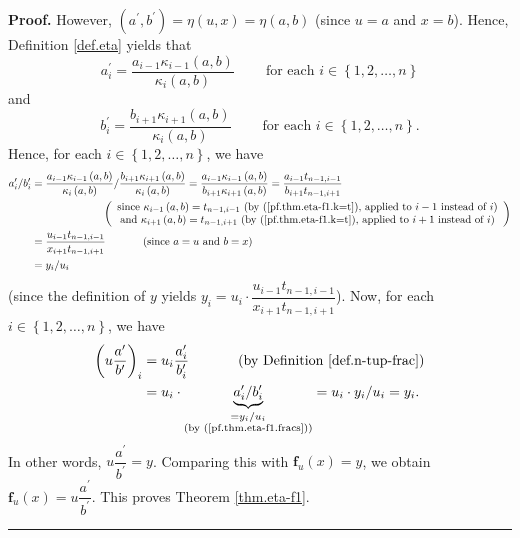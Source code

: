 \documentclass[numbers=enddot,12pt,final,onecolumn,notitlepage]{scrartcl}%
\theoremstyle{definition}
\newenvironment{proof}[1][Proof]{\noindent\textbf{#1.} }{\ \rule{0.5em}{0.5em}}
\begin{document}
\begin{proof}
However, $\left(  a^{\prime},b^{\prime}\right)  =\eta\left(  u,x\right)
=\eta\left(  a,b\right)  $ (since $u=a$ and $x=b$). Hence, Definition
\ref{def.eta} yields that
\[
a_{i}^{\prime}=\dfrac{a_{i-1}\kappa_{i-1}\left(  a,b\right)  }{\kappa
_{i}\left(  a,b\right)  }\ \ \ \ \ \ \ \ \ \ \text{for each }i\in\left\{
1,2,\ldots,n\right\}
\]
and%
\[
b_{i}^{\prime}=\dfrac{b_{i+1}\kappa_{i+1}\left(  a,b\right)  }{\kappa
_{i}\left(  a,b\right)  }\ \ \ \ \ \ \ \ \ \ \text{for each }i\in\left\{
1,2,\ldots,n\right\}  .
\]
Hence, for each $i\in\left\{  1,2,\ldots,n\right\}  $, we have%
\begin{align}
a_{i}^{\prime}/b_{i}^{\prime} &  =\dfrac{a_{i-1}\kappa_{i-1}\left(
a,b\right)  }{\kappa_{i}\left(  a,b\right)  }/\dfrac{b_{i+1}\kappa
_{i+1}\left(  a,b\right)  }{\kappa_{i}\left(  a,b\right)  }=\dfrac
{a_{i-1}\kappa_{i-1}\left(  a,b\right)  }{b_{i+1}\kappa_{i+1}\left(
a,b\right)  }=\dfrac{a_{i-1}t_{n-1,i-1}}{b_{i+1}t_{n-1,i+1}}\nonumber\\
&  \ \ \ \ \ \ \ \ \ \ \ \ \ \ \ \ \ \ \ \ \left(
\begin{array}
[c]{c}%
\text{since }\kappa_{i-1}\left(  a,b\right)  =t_{n-1,i-1}\text{ (by
(\ref{pf.thm.eta-f1.k=t}), applied to }i-1\text{ instead of }i\text{)}\\
\text{and }\kappa_{i+1}\left(  a,b\right)  =t_{n-1,i+1}\text{ (by
(\ref{pf.thm.eta-f1.k=t}), applied to }i+1\text{ instead of }i\text{)}%
\end{array}
\right)  \nonumber\\
&  =\dfrac{u_{i-1}t_{n-1,i-1}}{x_{i+1}t_{n-1,i+1}}\ \ \ \ \ \ \ \ \ \ \left(
\text{since }a=u\text{ and }b=x\right)  \nonumber\\
&  =y_{i}/u_{i}\label{pf.thm.eta-f1.fracs}%
\end{align}
(since the definition of $y$ yields $y_{i}=u_{i}\cdot\dfrac{u_{i-1}%
t_{n-1,i-1}}{x_{i+1}t_{n-1,i+1}}$). Now, for each $i\in\left\{  1,2,\ldots
,n\right\}  $, we have%
\begin{align*}
\left(  u\dfrac{a^{\prime}}{b^{\prime}}\right)  _{i} &  =u_{i}\dfrac
{a_{i}^{\prime}}{b_{i}^{\prime}}\ \ \ \ \ \ \ \ \ \ \left(  \text{by
Definition \ref{def.n-tup-frac}}\right)  \\
&  =u_{i}\cdot\underbrace{a_{i}^{\prime}/b_{i}^{\prime}}_{\substack{=y_{i}%
/u_{i}\\\text{(by (\ref{pf.thm.eta-f1.fracs}))}}}=u_{i}\cdot y_{i}/u_{i}%
=y_{i}.
\end{align*}
In other words, $u\dfrac{a^{\prime}}{b^{\prime}}=y$. Comparing this with
$\mathbf{f}_{u}\left(  x\right)  =y$, we obtain $\mathbf{f}_{u}\left(
x\right)  =u\dfrac{a^{\prime}}{b^{\prime}}$. This proves Theorem
\ref{thm.eta-f1}.
\end{proof}
\end{document}
